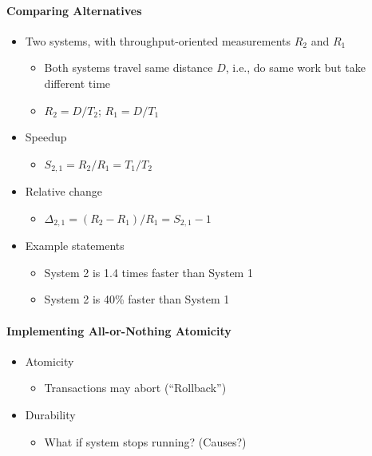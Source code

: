 \paragraph{Comparing Alternatives}
\begin{itemize}
\item Two systems, with throughput-oriented
  measurements $R_2$ and $R_1$
  \begin{itemize}
  \item Both systems travel same distance $D$, i.e., do same
    work but take different time
  \item $R_2 = D / T_2$; $R_1 = D /T_1$
  \end{itemize}


\item Speedup
  \begin{itemize}
  \item $S_{2,1} = R_2 / R_1 = T_1 / T_2$
  \end{itemize}

\item Relative change
  \begin{itemize}
  \item $\Delta_{2,1} = (R_2 - R_1) / R_1 = S_{2,1} - 1$
  \end{itemize}

\item Example statements
  \begin{itemize}
  \item System 2 is 1.4 times faster than System 1
  \item System 2 is 40\% faster than System 1
  \end{itemize}
\end{itemize}

\paragraph{Implementing All-or-Nothing Atomicity}
\begin{itemize}
\item Atomicity
  \begin{itemize}
  \item Transactions may abort (``Rollback'')
  \end{itemize}

\item Durability
  \begin{itemize}
  \item What if system stops running? (Causes?)
  \end{itemize}
\end{itemize}

